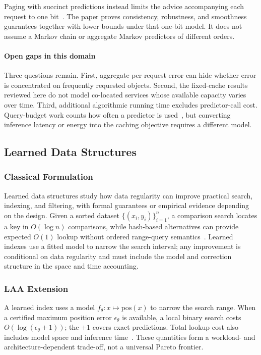 \documentclass[acmsmall,screen,nonacm]{acmart}
\theoremstyle{acmdefinition}%
\begin{document}
Paging with succinct predictions instead limits the advice accompanying each request to one bit~\cite{antoniadis2023succinct}. The paper proves consistency, robustness, and smoothness guarantees together with lower bounds under that one-bit model. It does not assume a Markov chain or aggregate Markov predictors of different orders.

\paragraph*{Open gaps in this domain}
Three questions remain. First, aggregate per-request error can hide whether error is concentrated on frequently requested objects. Second, the fixed-cache results reviewed here do not model co-located services whose available capacity varies over time. Third, additional algorithmic running time excludes predictor-call cost. Query-budget work counts how often a predictor is used~\cite{im2022parsimonious,sadek2024reduced}, but converting inference latency or energy into the caching objective requires a different model.

\subsection{Learned Data Structures}
\label{subsec:data_structures}

\subsubsection{Classical Formulation}
Learned data structures study how data regularity can improve practical search, indexing, and filtering, with formal guarantees or empirical evidence depending on the design. Given a sorted dataset $\{(x_i, y_i)\}_{i=1}^n$, a comparison search locates a key in $O(\log n)$ comparisons, while hash-based alternatives can provide expected $O(1)$ lookup without ordered range-query semantics~\cite{richter2015seven}. Learned indexes use a fitted model to narrow the search interval; any improvement is conditional on data regularity and must include the model and correction structure in the space and time accounting.

\subsubsection{LAA Extension}
A learned index uses a model $f_\theta:x\mapsto\widehat{\mathrm{pos}}(x)$ to narrow the search range. When a certified maximum position error $\epsilon_\theta$ is available, a local binary search costs $O(\log(\epsilon_\theta+1))$; the $+1$ covers exact predictions. Total lookup cost also includes model space and inference time~\cite{kraska2018case}. These quantities form a workload- and architecture-dependent trade-off, not a universal Pareto frontier.
\end{document}

